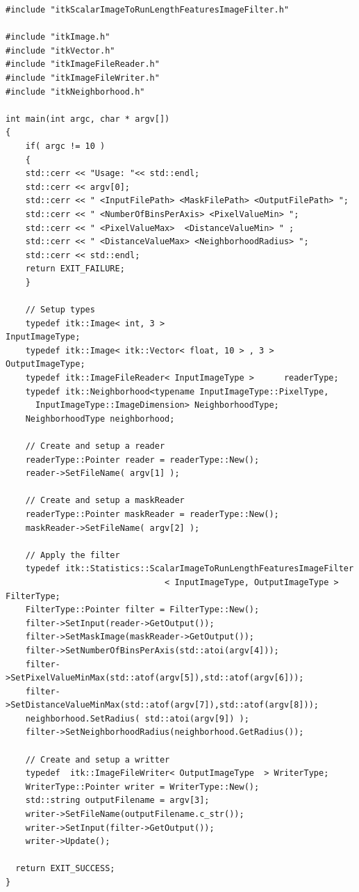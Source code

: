 \documentclass{InsightArticle}
\begin{document}
\begin{verbatim}
#include "itkScalarImageToRunLengthFeaturesImageFilter.h"

#include "itkImage.h"
#include "itkVector.h"
#include "itkImageFileReader.h"
#include "itkImageFileWriter.h"
#include "itkNeighborhood.h"

int main(int argc, char * argv[])
{
    if( argc != 10 )
    {
    std::cerr << "Usage: "<< std::endl;
    std::cerr << argv[0];
    std::cerr << " <InputFilePath> <MaskFilePath> <OutputFilePath> ";
    std::cerr << " <NumberOfBinsPerAxis> <PixelValueMin> ";
    std::cerr << " <PixelValueMax>  <DistanceValueMin> " ;
    std::cerr << " <DistanceValueMax> <NeighborhoodRadius> ";
    std::cerr << std::endl;
    return EXIT_FAILURE;
    }

    // Setup types
    typedef itk::Image< int, 3 >                        InputImageType;
    typedef itk::Image< itk::Vector< float, 10 > , 3 >  OutputImageType;
    typedef itk::ImageFileReader< InputImageType >      readerType;
    typedef itk::Neighborhood<typename InputImageType::PixelType,
      InputImageType::ImageDimension> NeighborhoodType;
    NeighborhoodType neighborhood;

    // Create and setup a reader
    readerType::Pointer reader = readerType::New();
    reader->SetFileName( argv[1] );

    // Create and setup a maskReader
    readerType::Pointer maskReader = readerType::New();
    maskReader->SetFileName( argv[2] );

    // Apply the filter
    typedef itk::Statistics::ScalarImageToRunLengthFeaturesImageFilter
                                < InputImageType, OutputImageType > FilterType;
    FilterType::Pointer filter = FilterType::New();
    filter->SetInput(reader->GetOutput());
    filter->SetMaskImage(maskReader->GetOutput());
    filter->SetNumberOfBinsPerAxis(std::atoi(argv[4]));
    filter->SetPixelValueMinMax(std::atof(argv[5]),std::atof(argv[6]));
    filter->SetDistanceValueMinMax(std::atof(argv[7]),std::atof(argv[8]));
    neighborhood.SetRadius( std::atoi(argv[9]) );
    filter->SetNeighborhoodRadius(neighborhood.GetRadius());

    // Create and setup a writter
    typedef  itk::ImageFileWriter< OutputImageType  > WriterType;
    WriterType::Pointer writer = WriterType::New();
    std::string outputFilename = argv[3];
    writer->SetFileName(outputFilename.c_str());
    writer->SetInput(filter->GetOutput());
    writer->Update();

  return EXIT_SUCCESS;
}
\end{verbatim}
\normalsize
\end{document}
